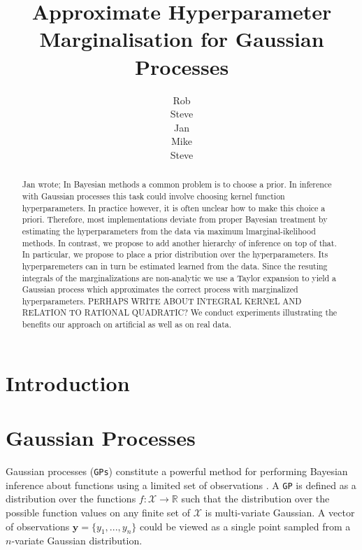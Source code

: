 \documentclass{article}
\title{Approximate Hyperparameter Marginalisation for Gaussian Processes}
\author{
Rob\\
\And
Steve\\
\And
Jan\\
\And
Mike\\
\And
Steve\\}
\begin{document}
\maketitle

\begin{abstract}
Jan wrote;
In Bayesian methods a common problem is to choose a prior. In inference with Gaussian processes this task could involve choosing kernel function hyperparameters. In practice however, it is often unclear how to make this choice a priori. Therefore, most implementations deviate from proper Bayesian treatment by estimating the hyperparameters from the data via maximum lmarginal-ikelihood methods. In contrast, we propose to add another hierarchy of inference on top of that. In particular, we propose to place a prior distribution over the hyperparameters. Its hyperparemeters can in turn be estimated learned from the data. Since the resuting integrals of the marginalizations are non-analytic we use a Taylor expansion to yield a Gaussian process which approximates the correct process with marginalized hyperparameters.
PERHAPS WRITE ABOUT INTEGRAL KERNEL AND RELATION TO RATIONAL QUADRATIC?
We conduct experiments illustrating the benefits our approach on artificial as well as on real data.
 
\end{abstract}


\section{Introduction}



\section{Gaussian Processes}

Gaussian processes (\verb"GPs") constitute a powerful method for performing Bayesian inference about functions using a limited set of observations \cite{rassandwill}. A \verb"GP" is defined as a distribution over the functions $f : \mathcal{X} \rightarrow \mathbb{R}$ such that the distribution over the possible function values on any finite set of $\mathcal{X}$ is multi-variate Gaussian. A vector of observations $\mathbf{y} = \{ y_1,...,y_n\}$ could be viewed as a single point sampled from a $n$-variate Gaussian distribution.
\end{document}
